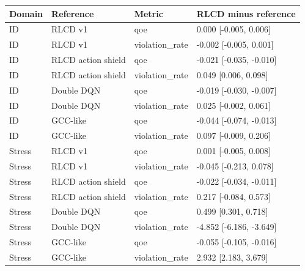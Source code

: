 \begin{tabular}{llll}
\toprule
Domain & Reference & Metric & RLCD minus reference \\
\midrule
ID & RLCD v1 & qoe & 0.000 [-0.005, 0.006] \\
ID & RLCD v1 & violation\_rate & -0.002 [-0.005, 0.001] \\
ID & RLCD action shield & qoe & -0.021 [-0.035, -0.010] \\
ID & RLCD action shield & violation\_rate & 0.049 [0.006, 0.098] \\
ID & Double DQN & qoe & -0.019 [-0.030, -0.007] \\
ID & Double DQN & violation\_rate & 0.025 [-0.002, 0.061] \\
ID & GCC-like & qoe & -0.044 [-0.074, -0.013] \\
ID & GCC-like & violation\_rate & 0.097 [-0.009, 0.206] \\
Stress & RLCD v1 & qoe & 0.001 [-0.005, 0.008] \\
Stress & RLCD v1 & violation\_rate & -0.045 [-0.213, 0.078] \\
Stress & RLCD action shield & qoe & -0.022 [-0.034, -0.011] \\
Stress & RLCD action shield & violation\_rate & 0.217 [-0.084, 0.573] \\
Stress & Double DQN & qoe & 0.499 [0.301, 0.718] \\
Stress & Double DQN & violation\_rate & -4.852 [-6.186, -3.649] \\
Stress & GCC-like & qoe & -0.055 [-0.105, -0.016] \\
Stress & GCC-like & violation\_rate & 2.932 [2.183, 3.679] \\
\bottomrule
\end{tabular}
